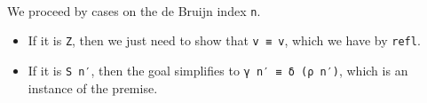 \begin{fence}
\begin{code}%
\>[0]\AgdaSpace{}%
\AgdaSymbol{:}\AgdaSpace{}%
\AgdaSpace{}%
\AgdaSymbol{\{}\AgdaSpace{}%
\AgdaSpace{}%
\AgdaSymbol{\}}\AgdaSpace{}%
\AgdaSymbol{\{}\AgdaSpace{}%
\AgdaSymbol{:}\AgdaSpace{}%
\AgdaSpace{}%
\AgdaSymbol{\}}\AgdaSpace{}%
\AgdaSymbol{\{}\AgdaSpace{}%
\AgdaSymbol{:}\AgdaSpace{}%
\AgdaSpace{}%
\AgdaSymbol{\}}\<%
\\
\>[0][@{}l@{\AgdaIndent{0}}]%
\>[2]\AgdaSpace{}%
\AgdaSymbol{(}\AgdaSpace{}%
\AgdaSymbol{:}\AgdaSpace{}%
\AgdaSpace{}%
\AgdaSpace{}%
\AgdaSymbol{)}\<%
\\
%
\>[2]%
\>[1327I]\AgdaSpace{}%
\AgdaSpace{}%
\AgdaSymbol{(}\AgdaSpace{}%
\AgdaSpace{}%
\AgdaSymbol{)}\<%
\\
\>[.][@{}l@{}]\<[1327I]%
\>[4]\AgdaComment{------------------------------}\<%
\\
%
\>[2]\AgdaSpace{}%
\AgdaSymbol{(}\AgdaSpace{}%
\AgdaSpace{}%
\AgdaSymbol{)}\AgdaSpace{}%
\AgdaSpace{}%
\AgdaSymbol{((}\AgdaSpace{}%
\AgdaSpace{}%
\AgdaSymbol{)}\AgdaSpace{}%
\AgdaSpace{}%
\AgdaSpace{}%
\AgdaSymbol{)}\<%
\\
\>[0]\AgdaSpace{}%
\AgdaSpace{}%
\AgdaSpace{}%
\AgdaSpace{}%
\AgdaSymbol{=}\AgdaSpace{}%
\<%
\\
\>[0]\AgdaSpace{}%
\AgdaSpace{}%
\AgdaSpace{}%
\AgdaSymbol{(}\AgdaSpace{}%
\AgdaSymbol{)}\AgdaSpace{}%
\AgdaSymbol{=}\AgdaSpace{}%
\AgdaSpace{}%
\<%
\end{code}
\end{fence}

We proceed by cases on the de Bruijn index \texttt{n}.

\begin{itemize}
\item
  If it is \texttt{Z}, then we just need to show that \texttt{v\ ≡\ v},
  which we have by \texttt{refl}.
\item
  If it is \texttt{S\ n′}, then the goal simplifies to
  \texttt{γ\ n′\ ≡\ δ\ (ρ\ n′)}, which is an instance of the premise.
\end{itemize}

